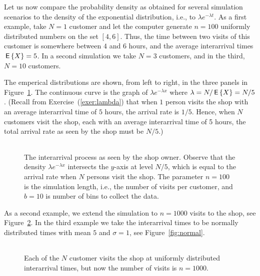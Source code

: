 Let us now compare the probability density as
obtained for several simulation scenarios to the density of the
exponential distribution, i.e., to $\lambda e^{-\lambda t}$.  As a
first example, take $N=1$ customer and let the computer generate
$n=100$ uniformly distributed numbers on the set $[4, 6]$.  Thus, the
time between two visits of this customer is somewhere between $4$ and
$6$ hours, and the average interarrival times $\,\mathsf{E}\left\{X\right\} = 5$. In a second
simulation we take $N=3$ customers, and in the third, $N=10$
customers. 

The emperical distributions are shown, from left to right,
in the three panels in Figure~\ref{fig:uniformfew}. The continuous
curve is the graph of $\lambda e^{-\lambda x}$ where
$\lambda = N/\,\mathsf{E}\left\{X\right\} = N/5$. (Recall from Exercise~(\ref{exer:lambda}) that when $1$
person visits the shop  with an average interarrival time of $5$
hours,  the arrival rate is $1/5$. Hence, when $N$ customers visit the shop, each with an average interarrival time of 5 hours, the total arrival rate as seen by the shop must be $N/5$.)  


\begin{figure}[ht]
  \centering
  \begin{tabular}[h]{c}
 \\
  \end{tabular}
  \caption{The interarrival process as seen by the shop owner. Observe
    that the density $\lambda e^{-\lambda x}$ intersects the $y$-axis
    at level $N/5$, which is equal to the arrival rate when $N$
    persons visit the shop. The parameter $n=100$ is the simulation
    length, i.e., the number of visits per customer, and $b=10$ is
    number of bins to collect the data.}
  \label{fig:uniformfew}
\end{figure}

As a second
example, we extend the simulation to $n=1000$ visits to the shop, see
Figure~\ref{fig:uniformmany}. In the third example we take the
interarrival times to be normally distributed times with mean $5$ and
$\sigma=1$, see Figure~\ref{fig:normal}.

\begin{figure}[ht]
  \centering
  \begin{tabular}[h]{c}
 \\
  \end{tabular}
  \caption{Each of the $N$ customer visits the shop at uniformly 
    distributed interarrival times, but now the number of visits is
    $n=1000$.}  
  \label{fig:uniformmany}
\end{figure}

